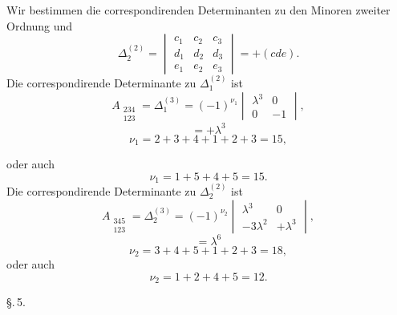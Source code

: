 Wir bestimmen die correspondirenden Determinanten zu den Minoren zweiter Ordnung
und
\[
\Delta_2^{(2)} = \begin{vmatrix} c_1 & c_2 & c_3 \\ d_1 & d_2 & d_3 \\ e_1 & e_2 & e_3 \end{vmatrix} = + (cde).
\]
Die correspondirende Determinante zu $\Delta_1^{(2)}$ ist
\[
A_{\substack{234 \\ 123}} = \Delta_1^{(3)} = (-1)^{\nu_1} \begin{vmatrix} \lambda^3 & 0 \\ 0 & -1 \end{vmatrix},
\]
\[
= + \lambda^3
\]
\[
\nu_1 = 2 + 3 + 4 + 1 + 2 + 3 = 15,
\]


oder auch
\[
\nu_1 = 1 + 5 + 4 + 5 = 15.
\]
Die correspondirende Determinante zu $\Delta_2^{(2)}$ ist
\[
A_{\substack{345 \\ 123}} = \Delta_2^{(3)} = (-1)^{\nu_2} \begin{vmatrix} \lambda^3 & 0 \\ -3\lambda^2 & +\lambda^3 \end{vmatrix},
\]
\[
= \lambda^6
\]
\[
\nu_2 = 3 + 4 + 5 + 1 + 2 + 3 = 18,
\]
oder auch
\[
\nu_2 = 1 + 2 + 4 + 5 = 12.
\]

\S.\,5.


